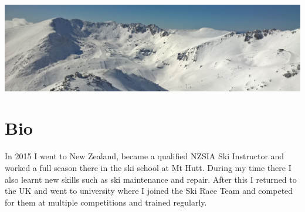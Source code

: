 \documentclass[letterpaper]{twentysecondcv} %
\begin{document}







\makeprofile %


\includegraphics[width=\textwidth]{snowMountainsBanner.jpg}

\section{Bio}

In 2015 I went to New Zealand, became a qualified NZSIA Ski Instructor and worked a full season there in the ski school at Mt Hutt. During my time there I also learnt new skills such as ski maintenance and repair. After this I returned to the UK and went to university where I joined the Ski Race Team and competed for them at multiple competitions and trained regularly.
\end{document}
